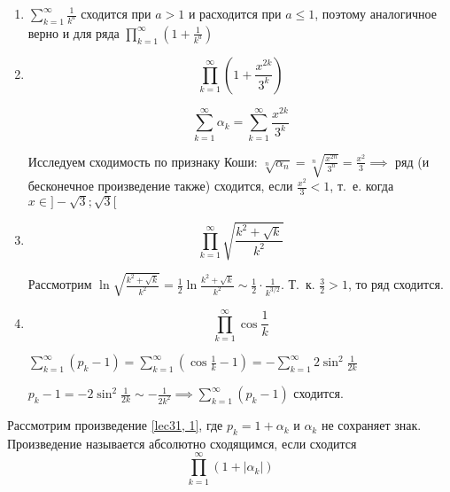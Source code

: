 \documentclass[../../main.tex]{subfiles}
\begin{document}
	\begin{example}
		\begin{enumerate}
			\item $\sum\limits_{k = 1}^{\infty} \frac{1}{k^a}$ сходится при $a > 1$ и 
			расходится при $a \leq 1$, поэтому аналогичное верно и для ряда 
			$\prod\limits_{k = 1}^{\infty} \left(1 + \frac{1}{k^a}\right)$
			
			\item \[\prod\limits_{k = 1}^{\infty} \left(1 + \frac{x^{2k}}{3^k}\right)\]
			
			\[\sum\limits_{k = 1}^{\infty}\alpha_k = \sum\limits_{k = 1}^{\infty} 
			\frac{x^{2k}}{3^k}\]
			
			Исследуем сходимость по признаку Коши: $\sqrt[n]{\alpha_n} = 
			\sqrt[n]{\frac{x^{2n}}{3^n}} = \frac{x^2}{3} \implies$ ряд (и бесконечное 
			произведение также) сходится, если $\frac{x^2}{3} < 1$, т.~е. когда $x \in 
			]-\sqrt{3}; \sqrt{3}[$
			
			\item \[\prod\limits_{k = 1}^{\infty} \sqrt{\frac{k^2 + \sqrt{k}}{k^2}}\]
			
			Рассмотрим $\ln\sqrt{\frac{k^2 + \sqrt{k}}{k^2}} = \frac{1}{2}\ln\frac{k^2 
			+ \sqrt{k}}{k^2} \sim \frac{1}{2} \cdot \frac{1}{k^{3/2}}$. Т.~к. 
			$\frac{3}{2} > 1$, то ряд сходится.
			
			\item \[\prod\limits_{k = 1}^{\infty} \cos\frac{1}{k}\]
			
			$\sum\limits_{k = 1}^{\infty}(p_k - 1) = \sum\limits_{k = 1}^{\infty} 
			(\cos\frac{1}{k} - 1) = -\sum\limits_{k = 1}^{\infty}2\sin^2\frac{1}{2k}$
			
			$p_k - 1 = -2\sin^2\frac{1}{2k} \sim -\frac{1}{2k^2} \implies 
			\sum\limits_{k = 1}^{\infty}(p_k - 1)$ сходится.
		\end{enumerate}	
	\end{example}

	Рассмотрим произведение \eqref{lec31, 1}, где $p_k = 1 + \alpha_k$ и 
	$\alpha_k$ не сохраняет знак. Произведение называется абсолютно сходящимся, 
	если сходится
	\begin{equation} \label{lec31, 6}
	 \prod\limits_{k = 1}^{\infty} (1 + |\alpha_k|)
	\end{equation}
	
\end{document}
